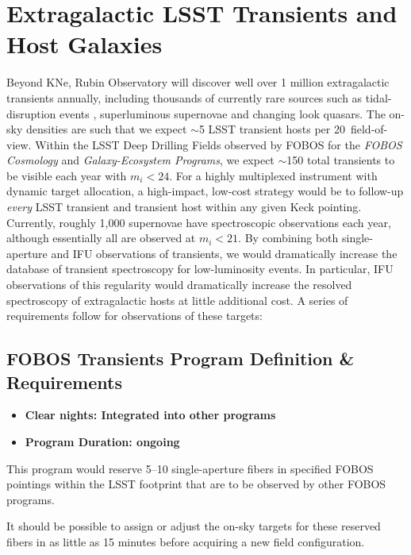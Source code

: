 \documentclass[11pt,a4paper,twoside,onecolumn,openany,final,oldfontcommands]{memoir}
\begin{document}
\section{Extragalactic LSST Transients and Host Galaxies}


Beyond KNe, Rubin Observatory will discover well over 1 million extragalactic transients annually, including thousands of currently rare sources such as tidal-disruption events \citep{bricman2020}, superluminous supernovae \citep{villar2018} and changing look quasars.  The on-sky densities are such that we expect $\sim$5 LSST transient hosts per 20\arcmin\ field-of-view.  Within the LSST Deep Drilling Fields observed by FOBOS for the {\it FOBOS Cosmology} and {\it Galaxy-Ecosystem Programs}, we expect $\sim$150 total transients to be visible each year with $m_i<24$. For a highly multiplexed instrument with dynamic target allocation, a high-impact, low-cost strategy would be to follow-up \textit{every} LSST transient and transient host within any given Keck pointing. Currently, roughly 1,000 supernovae have spectroscopic observations each year, although essentially all are observed at $m_i<21$. By combining both single-aperture and IFU observations of transients, we would dramatically increase the database of transient spectroscopy for low-luminosity events.  In particular, IFU observations of this regularity would dramatically increase the resolved spectroscopy of extragalactic hosts \citep[see a recent review by][]{anderson2015} at little additional cost. A series of requirements follow for observations of these targets:


\subsection{FOBOS Transients Program Definition \& Requirements}

\medskip
\begin{itemize}[leftmargin=0.3in, itemsep=0pt]
	\item[] \textbf{Clear nights: Integrated into other programs}
	\item[] \textbf{Program Duration: ongoing}
\end{itemize}


\begin{programrequirement}
\reqitem This program would reserve 5--10 single-aperture fibers in specified FOBOS pointings within the LSST footprint that are to be observed by other FOBOS programs.  

\reqitem It should be possible to assign or adjust the on-sky targets for these reserved fibers in as little as 15 minutes before acquiring a new field configuration.

\end{programrequirement}
\end{document}
